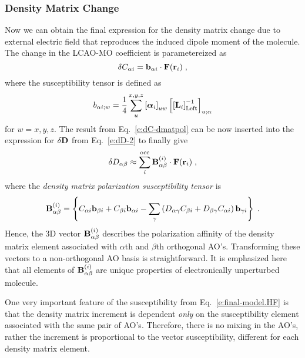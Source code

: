 \documentclass[aip,graphicx]{revtex4-1}
\newcommand{\BM}[1]{\bm{#1}}
\begin{document}
\subsubsection{Density Matrix Change}

Now we can obtain the final expression for the density matrix change 
due to external electric field that reproduces the 
induced dipole moment of the molecule.
The change in the LCAO\hyp{}MO coefficient is parametereized as
%
\begin{equation} \label{e:dC-dmatpol}
 \delta C_{\alpha i} = {\bf b}_{\alpha i} \cdot {\bf F}({\bf r}_i)  \;,
\end{equation}
%
where the susceptibility tensor is defined as
%
\begin{equation} \label{e:susceptibility-b}
  b_{\alpha i;w} = \frac{1}{4} \sum_u^{x, y, z} \left[ {\BM{\alpha}}_i \right]_{uw}
   \left[ \left[ {\bf L}_i  \right]^{-1}_{\rm Left} \right]_{u;\alpha}  
\end{equation}
%
for $w=x,y,z$. The result from Eq.~\eqref{e:dC-dmatpol} can be now inserted into 
the expression for $\delta {\bf D}$ from Eq.~\eqref{e:dD-2} to finally give
%
\begin{equation}\label{e:final-model.HF}
 \delta D_{\alpha\beta} \approx \sum_i^{\rm occ} {\bf B}^{(i)}_{\alpha\beta} \cdot {\bf F}({\bf r}_i)  \;,
\end{equation}
%
where the \emph{density matrix polarization susceptibility tensor} is
%
\begin{equation}  \label{e:susceptibility-B}
 {\bf B}^{(i)}_{\alpha\beta} = \left\{
%
                               C_{\alpha i} {\bf b}_{\beta i} + C_{\beta i} {\bf b}_{\alpha i}
                               - \sum_\gamma 
                                 \left( 
               D_{\alpha\gamma} C_{\beta i} + D_{\beta\gamma} C_{\alpha i}
                                 \right)
                                           {\bf b}_{\gamma i}
%
\right\}  \;.
\end{equation}
%
Hence, the 3D vector ${\bf B}^{(i)}_{\alpha\beta}$ describes the polarization affinity
of the density matrix element associated with $\alpha$th and $\beta$th orthogonal AO's.
Transforming these vectors to a non\hyp{}orthogonal AO basis is straightforward.
It is emphasized here that all elements of ${\bf B}_{\alpha\beta}^{(i)}$
are unique properties of electronically unperturbed molecule. 

One very important feature of the susceptibility from Eq.~\eqref{e:final-model.HF} is that
the density matrix increment is dependent \emph{only} on the susceptibility element associated with the same
pair of AO's. Therefore, there is no mixing in the AO's, rather the increment is proportional to the 
vector susceptibility, different for each density matrix element.
\end{document}
